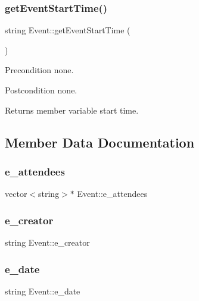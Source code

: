 \subsubsection{\texorpdfstring{get\+Event\+Start\+Time()}{getEventStartTime()}}
{\footnotesize\ttfamily string Event\+::get\+Event\+Start\+Time (\begin{DoxyParamCaption}{ }\end{DoxyParamCaption})}

\begin{DoxyPrecond}{Precondition}
none. 
\end{DoxyPrecond}
\begin{DoxyPostcond}{Postcondition}
none. 
\end{DoxyPostcond}
\begin{DoxyReturn}{Returns}
member variable start time. 
\end{DoxyReturn}


\subsection{Member Data Documentation}
\mbox{\label{class_event_a2c3f28f20c869c6dcc70d863fcf302ef}} 
\subsubsection{\texorpdfstring{e\+\_\+attendees}{e\_attendees}}
{\footnotesize\ttfamily vector$<$string$>$$\ast$ Event\+::e\+\_\+attendees}

\mbox{\label{class_event_ae3987340f5890193cba3e2d5b3a5d795}} 
\subsubsection{\texorpdfstring{e\+\_\+creator}{e\_creator}}
{\footnotesize\ttfamily string Event\+::e\+\_\+creator\hspace{0.3cm}{\ttfamily [private]}}

\mbox{\label{class_event_ad561caba64fcce6c406af8ac40845b5b}} 
\subsubsection{\texorpdfstring{e\+\_\+date}{e\_date}}
{\footnotesize\ttfamily string Event\+::e\+\_\+date\hspace{0.3cm}{\ttfamily [private]}}


